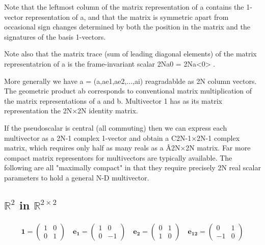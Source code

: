 \documentclass[a4paper]{book}
\numberwithin{equation}{chapter}
\begin{document}
Note that the leftmost column of the matrix representation of a contains the 1-vector representation of a, and 
that the matrix is symmetric apart from occasional sign changes determined by both the position in the matrix
and the signatures of the basis 1-vectors.

Note also that the matrix trace (sum of leading diagonal elements) of the matrix representatrion of a is the 
frame-invariant scalar 2Na0 = 2Na<0> .

\vspace{\baselineskip}

More generally we have a = (a,ae1,ae2,...,ai) reagradablde as 2N column vectors.  
The geometric product ab corresponds to conventional matrix multiplication of the matrix representations of a and b. Multivector 1 has as its matrix representation the 2N×2N identity matrix.

\vspace{\baselineskip}
 
If the pseudoscalar is central (all commuting) then we can express each multivector as a 2N-1 complex 1-vector and obtain a C2N-1×2N-1 complex matrix, which requires only half as many reals as a Â2N×2N matrix.
Far more compact matrix representors for multivectors are typically available. The following are all "maximally compact" in that they require precisely 2N real scalar parameters to hold a general N-D multivector. 

    
    \subsection{$\mathbb{R}^{2}$ in $\mathbb{R}^{2 \times 2}$}

    \begin{align*}
    \mathbf{1}=
    \begin{pmatrix}
    1 &0 \\
    0 &1
    \end{pmatrix}
    \quad
    \mathbf{e_1}=
    \begin{pmatrix}
     1 &0 \\
     0 &-1
    \end{pmatrix}
    \quad
    \mathbf{e_2}=
    \begin{pmatrix}
     0 &1 \\
     1 &0
    \end{pmatrix}
    \quad
    \mathbf{e_{12}}=
    \begin{pmatrix}
     0 &1 \\
     -1 &0
    \end{pmatrix}
    \end{align*}
    
\end{document}
